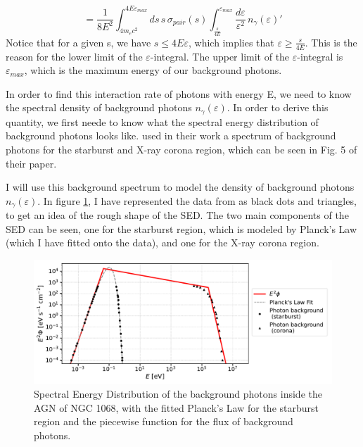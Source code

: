 \begin{equation}
    =  \frac{1}{8E^2}\int_{4m_ec^2}^{4E\varepsilon_{max}}ds\,s\,\sigma_{pair}(s)\int_{\frac{s}{4E}}^{\varepsilon_{max}}\frac{d\varepsilon}{\varepsilon^2}\,n_{\gamma}(\varepsilon)'
    \label{eq:interaction_rate_third_one}
\end{equation}
Notice that for a given s, we have $s \leq 4E\varepsilon$, which implies that $\varepsilon \geq \frac{s}{4E}$. This is the reason for the lower limit of the $\varepsilon$-integral. The upper limit of the $\varepsilon$-integral is $\varepsilon_{max}$, which is the maximum energy of our background photons.

In order to find this interaction rate of photons with energy E, we need to know the spectral density of background photons $n_{\gamma}(\varepsilon)$. In order to derive this quantity, we first neede to know what the spectral energy distribution of background photons looks like. \citet{Eichmann_2022} used in their work a spectrum of background photons for the starburst and X-ray corona region, which can be seen in Fig. 5 of their paper.

I will use this background spectrum to model the density of background photons $n_{\gamma}(\varepsilon)$. In figure \ref{fig:background_spectral_density}, I have represented the data from \citet{Eichmann_2022} as black dots and triangles, to get an idea of the rough shape of the SED. The two main components of the SED can be seen, one for the starburst region, which is modeled by Planck's Law (which I have fitted onto the data), and one for the X-ray corona region.

\begin{figure}[H]
    \centering
    \includegraphics[width=\textwidth]{Figures/Background_SED_AGN.pdf}
    \caption{Spectral Energy Distribution of the background photons inside the AGN of NGC 1068, with the fitted Planck's Law for the starburst region and the piecewise function for the flux of background photons.} 
    \label{fig:background_spectral_density}
\end{figure}

